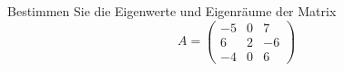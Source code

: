 
Bestimmen Sie die Eigenwerte und Eigenräume der Matrix
\[
A = \begin{pmatrix}
-5 & 0 & 7 \\
6 & 2 & -6 \\
-4 & 0 & 6
\end{pmatrix}
\]